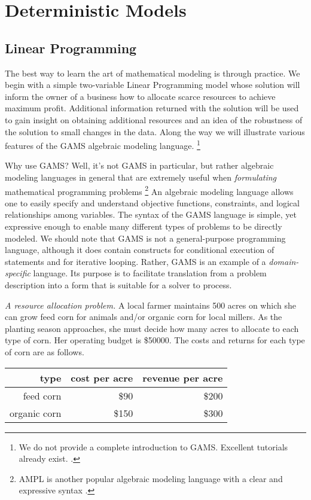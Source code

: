 \chapter{Deterministic Models}

\section{Linear Programming}

The best way to learn the art of mathematical modeling is through practice.
We begin with a simple two-variable Linear Programming model whose solution
will inform the owner of a business how to allocate scarce resources to achieve
maximum profit. Additional information returned with the solution will be used
to gain insight on obtaining additional resources and an idea of the robustness
of the solution to small changes in the data.
Along the way we will
illustrate various features of the GAMS algebraic modeling language. 
\footnote{We do not provide a complete introduction to GAMS.
Excellent tutorials already exist. \cite{Rosenthal,GAMS}.}

Why use GAMS? Well, it's not GAMS in particular, but rather
algebraic modeling languages in general that are extremely useful
when \emph{formulating} mathematical programming problems
\footnote{AMPL is another popular algebraic modeling language with a 
clear and expressive syntax \cite{fourer:2003}.} An
algebraic modeling language allows one to easily specify and
understand objective functions, constraints, and logical relationships
among variables. The syntax of the GAMS language is simple,
yet expressive enough to enable many different types of problems to be
directly modeled. We should note that GAMS is not a general-purpose
programming language, although it does contain constructs for
conditional execution of statements and for iterative looping.
Rather, GAMS is an example of a \emph{domain-specific} language.  Its
purpose is to facilitate translation from a problem description into a
form that is suitable for a solver to process.

\emph{A resource allocation problem.}
A local farmer maintains 500 acres on which she can grow feed corn for animals
and/or organic corn for local millers. As the planting season approaches,
she must decide how many acres to allocate to each type of corn.
Her operating budget is \$\num{50000}. The costs and returns for each
type of corn are as follows.

\vspace{.1in}
\begin{tabular}{rrr}
type & cost per acre & revenue per acre \\ \hline
feed corn & \$90 & \$200 \\
organic corn & \$150 & \$300
\end{tabular}
\vspace{.1in}

